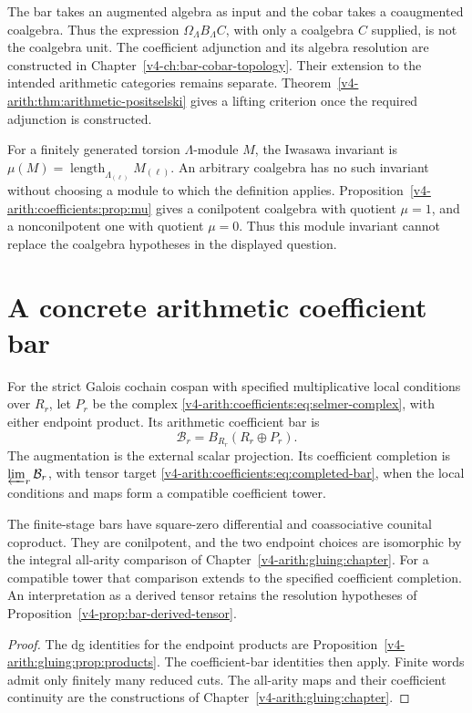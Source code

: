 The bar takes an augmented algebra as input and the cobar takes a
coaugmented coalgebra. Thus the expression
\(\Omega_\Lambda B_\Lambda C\), with only a coalgebra \(C\) supplied,
is not the coalgebra unit. The coefficient adjunction and its algebra
resolution are constructed in Chapter~\ref{v4-ch:bar-cobar-topology}.
Their extension to the intended arithmetic categories remains
separate. Theorem~\ref{v4-arith:thm:arithmetic-positselski} gives
a lifting criterion once the required adjunction is constructed.

\begin{remark}
For a finitely generated torsion \(\Lambda\)-module \(M\), the
Iwasawa invariant is
\(\mu(M)=\operatorname{length}_{\Lambda_{(\ell)}}M_{(\ell)}\).
An arbitrary coalgebra has no such invariant without choosing a
module to which the definition applies.
Proposition~\ref{v4-arith:coefficients:prop:mu} gives a conilpotent
coalgebra with quotient \(\mu=1\), and a nonconilpotent one with
quotient \(\mu=0\). Thus this module invariant cannot replace the
coalgebra hypotheses in the displayed question.
\end{remark}

\section{A concrete arithmetic coefficient bar}
\label{v4-arith:bar:concrete-construction}

\begin{definition}
\label{v4-arith:def:arith-bar-concrete}
For the strict Galois cochain cospan with specified multiplicative
local conditions over \(R_r\), let \(P_r\) be the complex
\eqref{v4-arith:coefficients:eq:selmer-complex}, with either endpoint
product. Its arithmetic coefficient bar is
\[
 \mathcal B_r=B_{R_r}(R_r\oplus P_r).
\]
The augmentation is the external scalar projection. Its coefficient
completion is \(\varprojlim_r\mathcal B_r\), with tensor target
\eqref{v4-arith:coefficients:eq:completed-bar}, when the local
conditions and maps form a compatible coefficient tower.
\end{definition}

\begin{theorem}
\label{v4-arith:thm:bar-verifications}
The finite-stage bars have square-zero differential and coassociative
counital coproduct. They are conilpotent, and the two endpoint choices
are isomorphic by the integral all-arity comparison of
Chapter~\ref{v4-arith:gluing:chapter}. For a compatible tower that
comparison extends to the specified coefficient completion.
An interpretation as a derived tensor retains the resolution
hypotheses of Proposition~\ref{v4-prop:bar-derived-tensor}.
\end{theorem}
\begin{proof}
The dg identities for the endpoint products are
Proposition~\ref{v4-arith:gluing:prop:products}. The coefficient-bar
identities then apply. Finite words admit only finitely many reduced
cuts. The all-arity maps and their coefficient continuity are the
constructions of Chapter~\ref{v4-arith:gluing:chapter}.
\end{proof}

